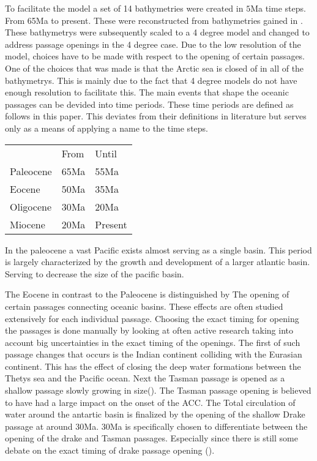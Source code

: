 To facilitate the model a set of 14 bathymetries were created in $5$Ma time steps. From 65Ma to present. These were reconstructed from bathymetries gained in \cite{Baatsen2016Aug}. 
These bathymetrys were subsequently scaled to a 4 degree model and changed to address passage openings in the 4 degree case. Due to the low resolution of the model, choices have to be made with respect to the opening of certain passages. One of the choices that was made is that the Arctic sea is closed of in all of the bathymetrys. This is mainly due to the fact that 4 degree models do not have enough resolution to facilitate this.
The main events that shape the oceanic passages can be devided into time periods. These time periods are defined as follows in this paper. This deviates from their definitions in literature but serves only as a means of applying a name to the time steps.
\begin{table}[H]
	\begin{tabular}{lll}
		&From &Until \\
		Paleocene & 65Ma&55Ma    \\
		Eocene    & 50Ma&35Ma     \\
		Oligocene & 30Ma&20Ma    \\
		Miocene   & 20Ma&Present 
	\end{tabular}
\end{table}
In the paleocene a vast Pacific exists almost serving as a single basin. This period is largely characterized by the growth and development of a larger atlantic basin. Serving to decrease the size of the pacific basin.

The Eocene in contrast to the Paleocene is distinguished by The opening of certain passages connecting oceanic basins. These effects are often studied extensively for each individual passage. Choosing the exact timing for opening the passages is done manually by looking at often active research taking into account big uncertainties in the exact timing of the openings. 
The first of such passage changes that occurs is the Indian continent colliding with the Eurasian continent. This has the effect of closing the deep water formations between the Thetys sea and the Pacific ocean.
Next the Tasman passage is opened as a shallow passage slowly growing in size(\cite{Lawver2003Sep}). The Tasman passage opening is believed to have had a large impact on the onset of the ACC. The Total circulation of water around the antartic basin is finalized by the opening of the shallow Drake passage at around 30Ma. 30Ma is specifically chosen to differentiate between the opening of the drake and Tasman passages. Especially since there is still some debate on the exact timing of drake passage opening (\cite{Scher2006Apr}).

